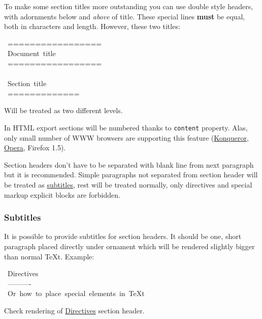 \documentclass[12pt]{article}
\begin{document}
To make some section titles more outstanding you can use double style headers,
with adornments below and \emph{above} of title. These special lines \textbf{must} be
equal, both in characters and length. However, these two titles:

\begin{ttfamily}\begin{flushleft}
\mbox{~=================}\\
\mbox{~Document~title}\\
\mbox{~=================}\\
\mbox{}\\
\mbox{~Section~title}\\
\mbox{~=============}\\
\end{flushleft}\end{ttfamily}

Will be treated as two different levels.

In HTML export sections will be numbered thanks to \texttt{content} property.
Alas, only small number of WWW browsers are supporting this feature
(\href{http://www.kde.org}{Konqueror}, \href{http://www.opera.com}{Opera}, Firefox 1.5).

Section headers don't have to be separated with blank line from next paragraph
but it is recommended. Simple paragraphs not separated from section header
will be treated as \href{\#lsubtitles}{subtitles}, rest will be treated normally, only directives
and special markup explicit blocks are forbidden.

\hypertarget{lsubtitles}{}
\subsubsection{Subtitles}

It is possible to provide subtitles for section headers. It should be one,
short paragraph placed directly under ornament which will be rendered slightly
bigger than normal \TeX{}t. Example:

\begin{ttfamily}\begin{flushleft}
\mbox{~Directives}\\
\mbox{~----------}\\
\mbox{~Or~how~to~place~special~elements~in~\TeX{}t}\\
\end{flushleft}\end{ttfamily}

Check rendering of \href{\#ldirectives}{Directives} section header.
\end{document}
